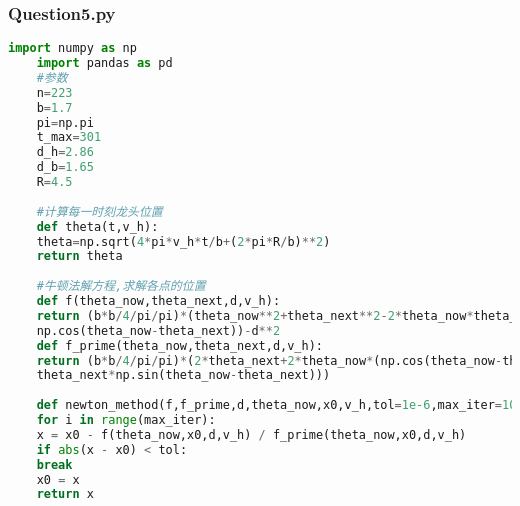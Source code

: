 \documentclass[withoutpreface,bwprint]{cumcmthesis} %
\begin{document}
	\subsubsection*{Question5.py}
	\begin{lstlisting}[language=Python]
	import numpy as np
	import pandas as pd
	#参数
	n=223
	b=1.7
	pi=np.pi
	t_max=301
	d_h=2.86
	d_b=1.65
	R=4.5
	
	#计算每一时刻龙头位置
	def theta(t,v_h):
	theta=np.sqrt(4*pi*v_h*t/b+(2*pi*R/b)**2)
	return theta
	
	#牛顿法解方程,求解各点的位置
	def f(theta_now,theta_next,d,v_h):
	return (b*b/4/pi/pi)*(theta_now**2+theta_next**2-2*theta_now*theta_next*
	np.cos(theta_now-theta_next))-d**2
	def f_prime(theta_now,theta_next,d,v_h):
	return (b*b/4/pi/pi)*(2*theta_next+2*theta_now*(np.cos(theta_now-theta_next)-
	theta_next*np.sin(theta_now-theta_next)))
	
	def newton_method(f,f_prime,d,theta_now,x0,v_h,tol=1e-6,max_iter=100):
	for i in range(max_iter):
	x = x0 - f(theta_now,x0,d,v_h) / f_prime(theta_now,x0,d,v_h)
	if abs(x - x0) < tol:
	break
	x0 = x
	return x
	

\end{lstlisting}
\end{document}
